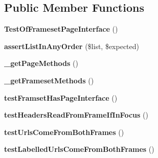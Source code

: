 \subsection*{Public Member Functions}
\begin{DoxyCompactItemize}
\item 
\hypertarget{class_test_of_frameset_page_interface_a7f9fbbbc642d79398ec1efa125ea5537}{
{\bfseries TestOfFramesetPageInterface} ()}
\label{class_test_of_frameset_page_interface_a7f9fbbbc642d79398ec1efa125ea5537}

\item 
\hypertarget{class_test_of_frameset_page_interface_add70226459dbfb5e740880f6684e8a38}{
{\bfseries assertListInAnyOrder} (\$list, \$expected)}
\label{class_test_of_frameset_page_interface_add70226459dbfb5e740880f6684e8a38}

\item 
\hypertarget{class_test_of_frameset_page_interface_aa93cb12e388509a39fb34ea38e52659e}{
{\bfseries \_\-getPageMethods} ()}
\label{class_test_of_frameset_page_interface_aa93cb12e388509a39fb34ea38e52659e}

\item 
\hypertarget{class_test_of_frameset_page_interface_a7ef970cab65601d54bd955ec7f823889}{
{\bfseries \_\-getFramesetMethods} ()}
\label{class_test_of_frameset_page_interface_a7ef970cab65601d54bd955ec7f823889}

\item 
\hypertarget{class_test_of_frameset_page_interface_adec5df95ba5bd7773ea58d0246a350e5}{
{\bfseries testFramsetHasPageInterface} ()}
\label{class_test_of_frameset_page_interface_adec5df95ba5bd7773ea58d0246a350e5}

\item 
\hypertarget{class_test_of_frameset_page_interface_a7bbf83788d2c589d2604301a334751c6}{
{\bfseries testHeadersReadFromFrameIfInFocus} ()}
\label{class_test_of_frameset_page_interface_a7bbf83788d2c589d2604301a334751c6}

\item 
\hypertarget{class_test_of_frameset_page_interface_a6d8e858ed419d0c38e403ac1461c0245}{
{\bfseries testUrlsComeFromBothFrames} ()}
\label{class_test_of_frameset_page_interface_a6d8e858ed419d0c38e403ac1461c0245}

\item 
\hypertarget{class_test_of_frameset_page_interface_ab5d82ad7897caa5222048795ea2bc149}{
{\bfseries testLabelledUrlsComeFromBothFrames} ()}
\label{class_test_of_frameset_page_interface_ab5d82ad7897caa5222048795ea2bc149}


\end{DoxyCompactItemize}
